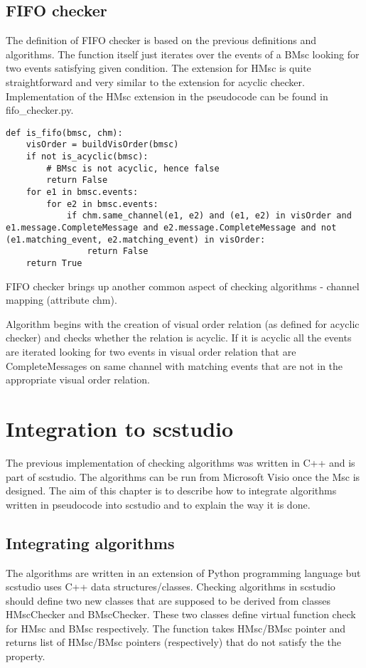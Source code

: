 \documentclass[11pt,oneside]{fithesis2}
\begin{document}
\section{FIFO checker}

The definition of FIFO checker is based on the previous definitions and algorithms. The function itself just iterates over the events of a BMsc looking for two events satisfying given condition. The extension for HMsc is quite straightforward and very similar to the extension for acyclic checker. Implementation of the HMsc extension in the pseudocode can be found in fifo\_checker.py.
\begin{lstlisting}
def is_fifo(bmsc, chm):
    visOrder = buildVisOrder(bmsc)
    if not is_acyclic(bmsc):
        # BMsc is not acyclic, hence false
        return False
    for e1 in bmsc.events:
        for e2 in bmsc.events:
            if chm.same_channel(e1, e2) and (e1, e2) in visOrder and e1.message.CompleteMessage and e2.message.CompleteMessage and not (e1.matching_event, e2.matching_event) in visOrder:
                return False
    return True
\end{lstlisting}

FIFO checker brings up another common aspect of checking algorithms - channel mapping (attribute chm).

Algorithm begins with the creation of visual order relation (as defined for acyclic checker) and checks whether the relation is acyclic. If it is acyclic all the events are iterated looking for two events in visual order relation that are CompleteMessages on same channel with matching events that are not in the appropriate visual order relation.


\chapter{Integration to scstudio}
The previous implementation of checking algorithms was written in C++ and is part of scstudio. The algorithms can be run from Microsoft Visio once the Msc is designed.
The aim of this chapter is to describe how to integrate algorithms written in pseudocode into scstudio and to explain the way it is done.
\section{Integrating algorithms}
The algorithms are written in an extension of Python programming language but scstudio uses C++ data structures/classes. Checking algorithms in scstudio should define two new classes that are supposed to be derived from classes HMscChecker and BMscChecker. These two classes define virtual function check for HMsc and BMsc respectively. The function takes HMsc/BMsc pointer and returns list of HMsc/BMsc pointers (respectively) that do not satisfy the the property.
\end{document}
